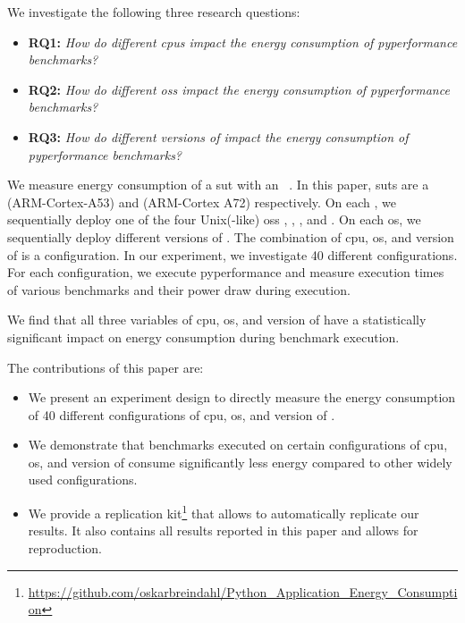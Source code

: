 We investigate the following three research questions:
\begin{itemize}
  \item \textbf{RQ1:} \textit{How do different \glspl{cpu} impact the energy consumption of \gls{pyperformance} benchmarks?}
  \item \textbf{RQ2:} \textit{How do different \glspl{os} impact the energy consumption of \gls{pyperformance} benchmarks?}
  \item \textbf{RQ3:} \textit{How do different versions of \cp impact the energy consumption of \gls{pyperformance} benchmarks?}
\end{itemize}

We measure energy consumption of a \gls{sut} with an ~\cite{qoitech2022otii}.
In this paper, \glspl{sut} are a  (ARM-Cortex-A53) and  (ARM-Cortex A72) respectively.
On each , we sequentially deploy one of the four Unix(-like) \glspl{os} , , , and .
On each \gls{os}, we sequentially deploy different versions of \cp.
The combination of \gls{cpu}, \gls{os}, and version of \cp is a configuration.
In our experiment, we investigate 40 different configurations.
For each configuration, we execute \gls{pyperformance} and measure execution times of various benchmarks and their power draw during execution.

We find that all three variables of \gls{cpu}, \gls{os}, and version of \cp have a statistically significant impact on energy consumption during benchmark execution.


The contributions of this paper are:
\begin{itemize}
  \item We present an experiment design to directly measure the energy consumption of 40 different configurations of \gls{cpu}, \gls{os}, and version of \cp.
  \item We demonstrate that benchmarks executed on certain configurations of \gls{cpu}, \gls{os}, and version of \cp consume significantly less energy compared to other widely used configurations.
  \item We provide a replication kit\footnote{\url{https://github.com/oskarbreindahl/Python_Application_Energy_Consumption}} that allows to automatically replicate our results. It also contains all results reported in this paper and allows for reproduction.
\end{itemize}
